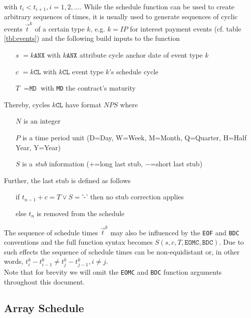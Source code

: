 \documentclass[9pt,oneside]{amsart}
\newcommand{\attr}[1]{\texttt{#1}}
\newcommand{\sdl}[3]{S(#1,#2,#3)}
\begin{document}
\begin{multicols}{2}
with $t_i<t_{i+1}, i=1,2,...$. While the schedule function can be used to create arbitrary sequences of times, it is usually used to generate sequences of cyclic events $\vec{t}^k$ of a certain type $k$, e.g. $k=IP$ for interest payment events (cf. table \ref{tbl:events}) and the following build inputs to the function

\begin{itemize}
	\item[$s$] $=k\attr{ANX}$ with $k\attr{ANX}$ attribute cycle anchor date of event type $k$
	
	\item[$c$] $=k\attr{CL}$ with $k\attr{CL}$ event type $k$'s schedule cycle
	
	\item[$T$] $=\attr{MD}$ with \attr{MD} the contract's maturity
\end{itemize}

Thereby, cycles $k\attr{CL}$ have format $NPS$ where 

\begin{itemize}
	\item[$N$] is an integer
	\item[$P$] is a time period unit (D=Day, W=Week, M=Month, Q=Quarter, H=Half Year, Y=Year)
	\item[$S$] is a \textit{stub} information ($+$=long last stub, $-$=short last stub)
\end{itemize}

Further, the last stub is defined as follows

\begin{itemize}
	\item[if] $t_{n-1}+c=T \lor S=$'-' then no stub correction applies

	\item[else] $t_n$ is removed from the schedule
\end{itemize}

The sequence of schedule times $\vec{t}^k$ may also be influenced by the \attr{EOF} and \attr{BDC} conventions and the full function syntax becomes $\sdl{s}{c}{T, \attr{EOMC}, \attr{BDC}}$. Due to such effects the sequence of schedule times can be non-equidistant or, in other words, $t_i^k-t_{i-1}^k\neq t_j^k-t_{j-1}^k, i\neq j$.\\

Note that for brevity we will omit the \attr{EOMC} and \attr{BDC} function arguments throughout this document.


\subsection{Array Schedule}\label{sec:arrayschedule}


\end{multicols}
\end{document}
